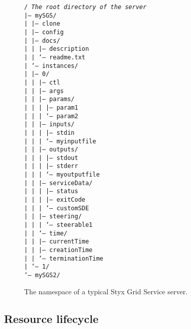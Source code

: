 \documentclass{llncs}
\begin{document}
\begin{figure}
{\tt /  {\em The root directory of the server}\\
|-- mySGS/\\
|   |-- clone\\
|   |-- config\\
|   |-- docs/\\
|   |   |-- description\\
|   |   `-- readme.txt\\
|   `-- instances/\\
|       |-- 0/\\
|       |    |-- ctl\\
|       |    |-- args\\
|       |    |-- params/\\
|       |    |   |-- param1\\
|       |    |   `-- param2\\
|       |    |-- inputs/\\
|       |    |   |-- stdin\\
|       |    |   `-- myinputfile\\
|       |    |-- outputs/\\
|       |    |   |-- stdout\\
|       |    |   |-- stderr\\
|       |    |   `-- myoutputfile\\
|       |    |-- serviceData/\\
|       |    |   |-- status\\
|       |    |   |-- exitCode\\
|       |    |   `-- customSDE\\
|       |    |-- steering/\\
|       |    |   `-- steerable1\\
|       |    `-- time/\\
|       |        |-- currentTime\\
|       |        |-- creationTime\\
|       |        `-- terminationTime\\
|       `-- 1/\\
`-- mySGS2/}
\caption{The namespace of a typical Styx Grid Service server.}\label{fig:sgsnamespace}
\end{figure}

\subsection{Resource lifecycle}
%
\end{document}
